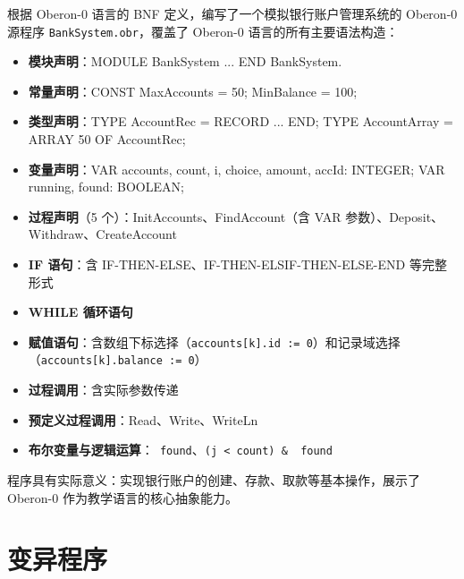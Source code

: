 根据 Oberon-0 语言的 BNF 定义，编写了一个模拟银行账户管理系统的 Oberon-0 源程序 \texttt{BankSystem.obr}，覆盖了 Oberon-0 语言的所有主要语法构造：

\begin{itemize}
    \item \textbf{模块声明}：MODULE BankSystem ... END BankSystem.
    \item \textbf{常量声明}：CONST MaxAccounts = 50; MinBalance = 100;
    \item \textbf{类型声明}：TYPE AccountRec = RECORD ... END; TYPE AccountArray = ARRAY 50 OF AccountRec;
    \item \textbf{变量声明}：VAR accounts, count, i, choice, amount, accId: INTEGER; VAR running, found: BOOLEAN;
    \item \textbf{过程声明}（5 个）：InitAccounts、FindAccount（含 VAR 参数）、Deposit、Withdraw、CreateAccount
    \item \textbf{IF 语句}：含 IF-THEN-ELSE、IF-THEN-ELSIF-THEN-ELSE-END 等完整形式
    \item \textbf{WHILE 循环语句}
    \item \textbf{赋值语句}：含数组下标选择（\texttt{accounts[k].id := 0}）和记录域选择（\texttt{accounts[k].balance := 0}）
    \item \textbf{过程调用}：含实际参数传递
    \item \textbf{预定义过程调用}：Read、Write、WriteLn
    \item \textbf{布尔变量与逻辑运算}：\texttt{~found}、\texttt{(j < count) \& ~found}
\end{itemize}

程序具有实际意义：实现银行账户的创建、存款、取款等基本操作，展示了 Oberon-0 作为教学语言的核心抽象能力。

\section{变异程序}

